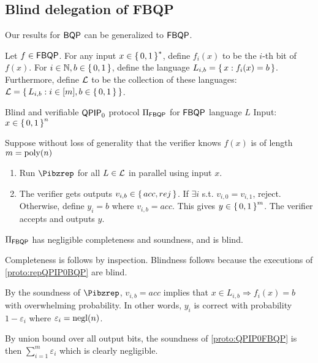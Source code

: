 \subsection{Blind delegation of FBQP}


Our results for $\operatorname{\mathsf{BQP}}$ can be generalized to $\operatorname{\mathsf{FBQP}}$.

Let $f\in\operatorname{\mathsf{FBQP}}$.
For any input $x\in\set{0, 1}^*$, define $f_i(x)$ to be the $i$-th bit of $f(x)$.
For $i\in\mathbb{N}, b\in\set{0,1}$, define the language $L_{i, b}=\set{x:f_i(x)=b}$.
Furthermore, define ${\cal L}$ to be the collection of these languages: ${\cal L} = \set{L_{i, b}: i\in[m], b\in\set{0, 1}}$.

\begin{protocol}{Blind and verifiable $\operatorname{\mathsf{QPIP}}_0$ protocol $\Pi_{\operatorname{\mathsf{FBQP}}}$ for $\operatorname{\mathsf{FBQP}}$ language $L$}
	\label{proto:QPIP0FBQP}
	Input: $x\in\set{0, 1}^n$

	Suppose without loss of generality that the verifier knows $f(x)$ is of length $m=\operatorname*{\operatorname{poly}}(n)$ 
	\begin{enumerate}
		\item Run $\Pibzrep$ for all $L\in{\cal L}$ in parallel using input $x$.
		\item The verifier gets outputs $v_{i, b}\in\set{acc, rej}$.
			If $\exists i$ s.t. $v_{i,0}=v_{i,1}$, reject.
			Otherwise, define $y_i = b$ where $v_{i, b}=acc$. This gives $y\in\set{0,1}^m$.
			The verifier accepts and outputs $y$.
	\end{enumerate}
\end{protocol}

\begin{theorem}
	$\Pi_{\operatorname{\mathsf{FBQP}}}$ has negligible completeness and soundness, and is blind.
\end{theorem}
\begin{prf}
	Completeness is follows by inspection.
	Blindness follows because the executions of \cref{proto:repQPIP0BQP} are blind.

	By the soundness of $\Pibzrep$, $v_{i, b}=acc$ implies that $x\in L_{i, b}\Rightarrow f_i(x)=b$ with overwhelming probability.
	In other words, $y_i$ is correct with probability $1-\varepsilon_i$ where $\varepsilon_i=\operatorname{negl}(n)$. 
	
	By union bound over all output bits, the soundness of \cref{proto:QPIP0FBQP} is then
	$\sum_{i=1}^m \varepsilon_i$
	which is clearly negligible.
\end{prf}
